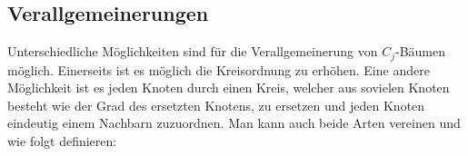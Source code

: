 \subsection{Verallgemeinerungen}
Unterschiedliche Möglichkeiten sind für die Verallgemeinerung von $C_j$-Bäumen möglich. Einerseits ist es möglich die Kreisordnung zu erhöhen. Eine andere Möglichkeit ist es jeden Knoten durch einen Kreis, welcher aus sovielen Knoten besteht wie der Grad des ersetzten Knotens, zu ersetzen und jeden Knoten eindeutig einem Nachbarn zuzuordnen. Man kann auch beide Arten vereinen und wie folgt definieren:
\begin{comment}
\begin{defi}
For a given tree $T=(V,E)$ with $deg(v_i)\leq 3$ for $v_i \in V$, the $C_j$ Tree is build in the following way: 
   Let $$V'=\{v_k|v_k \in V \wedge deg(v_k)=3\}\subseteq V$$ be a subset of the vertices of the graph $B$. Replace each element $v_j \in V'$ by a $C_k$ with $k \geq 3$ (call this subgraphs \emph{$C_{k,3,j}$}), so that at most one vertex of $C_{k,3,j}$ is connected to exactly one neightbour of $v_j$. The three neightbours of $C_{k,3,j}$ are called the \emph{$C_{k,3,j}$-$children$}. If two of the $C_{k,3,j}$-$children$ are leafs, so the subgraph including the $C_{k,3,j}$ his neighbours is called a \emph{$C_{k,3,j}$-$leaf$}.
\end{defi}

\begin{defi}
For a given tree $T=(V,E)$ with $deg(v_i)\leq n$ for $v_i \in V$, the $C_j$ Tree is build in the following way: 
   Let $$V'=\{v_k|v_k \in V \wedge deg(v_k)=n\}\subseteq V$$ be a subset of the vertices of the graph $B$. Replace each element $v_j \in V'$ by a $C_n$ (call this subgraphs \emph{$C_{n,j}$}), so that exactly one vertex of $C_{n,j}$ is connected to exactly one neightbour of $v_j$. The $n$ neightbours of $C_{n,j}$ are called the \emph{$C_{n,j}$-$children$}. If two of the $C_{n,j}$-$children$ are leafs, so the subgraph including the $C_{n,j}$ his neighbours is called a \emph{$C_{n,j}$-$leaf$}.
\end{defi}

\begin{defi}
For a given tree $T=(V,E)$ with $deg(v_i)\leq n$ for $v_i \in V$, the $C_j$ Tree is build in the following way: 
   Let $$V'=\{v_k|v_k \in V \wedge deg(v_k)=n\}\subseteq V$$ be a subset of the vertices of the graph $B$. Replace each element $v_j \in V'$ by a $C_k$ with $k \geq n$ (call this subgraphs \emph{$C_{k,n,j}$}), so that at most one vertex of $C_{k,n,j}$ is connected to exactly one neightbour of $v_j$. The t$n$ neightbours of $C_{k,n,j}$ are called the \emph{$C_{k,n,j}$-$children$}. If two of the $C_{k,n,j}$-$children$ are leafs, so the subgraph including the $C_{k,n,j}$ his neighbours is called a \emph{$C_{k,n,j}$-$leaf$}.
\end{defi}
\end{comment}
